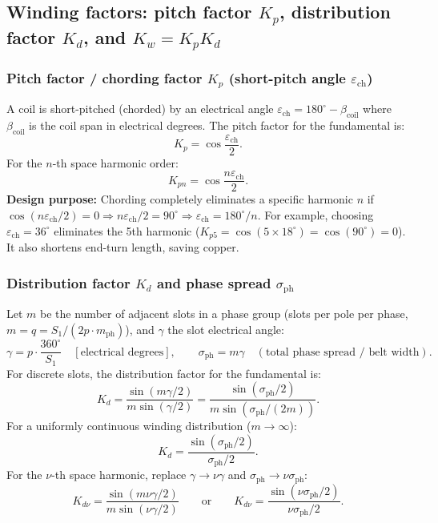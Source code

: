 \subsection{Winding factors: pitch factor $K_p$, distribution factor $K_d$, and $K_w = K_p K_d$}

\subsubsection{Pitch factor / chording factor $K_p$ (short-pitch angle $\varepsilon_{\mathrm{ch}}$)}
A coil is short-pitched (chorded) by an electrical angle \(\varepsilon_{\mathrm{ch}} = 180^\circ - \beta_{\mathrm{coil}}\) where \(\beta_{\mathrm{coil}}\) is the coil span in electrical degrees.
The pitch factor for the fundamental is:
\[
K_p = \cos\frac{\varepsilon_{\mathrm{ch}}}{2}.
\]
For the \(n\)-th space harmonic order:
\[
K_{pn} = \cos\frac{n\varepsilon_{\mathrm{ch}}}{2}.
\]
\textbf{Design purpose:} Chording completely eliminates a specific harmonic \(n\) if \(\cos(n\varepsilon_{\mathrm{ch}}/2) = 0 \Rightarrow n\varepsilon_{\mathrm{ch}}/2 = 90^\circ \Rightarrow \varepsilon_{\mathrm{ch}} = 180^\circ/n\). For example, choosing \(\varepsilon_{\mathrm{ch}} = 36^\circ\) eliminates the 5th harmonic (\(K_{p5} = \cos(5\times 18^\circ) = \cos(90^\circ) = 0\)). It also shortens end-turn length, saving copper.

\subsubsection{Distribution factor $K_d$ and phase spread $\sigma_{\mathrm{ph}}$}
Let \(m\) be the number of adjacent slots in a phase group (slots per pole per phase, \(m = q = S_1/(2p \cdot m_{\mathrm{ph}})\)), and \(\gamma\) the slot electrical angle:
\[
\gamma = p \cdot \frac{360^\circ}{S_1}\quad[\text{electrical degrees}],
\qquad
\sigma_{\mathrm{ph}} = m\gamma\quad(\text{total phase spread / belt width}).
\]
For discrete slots, the distribution factor for the fundamental is:
\[
K_d = \frac{\sin(m\gamma/2)}{m\sin(\gamma/2)} = \frac{\sin(\sigma_{\mathrm{ph}}/2)}{m\sin(\sigma_{\mathrm{ph}}/(2m))}.
\]
For a uniformly continuous winding distribution (\(m\to\infty\)):
\[
K_d = \frac{\sin(\sigma_{\mathrm{ph}}/2)}{\sigma_{\mathrm{ph}}/2}.
\]
For the \(\nu\)-th space harmonic, replace \(\gamma\to \nu\gamma\) and \(\sigma_{\mathrm{ph}}\to \nu\sigma_{\mathrm{ph}}\):
\[
K_{d\nu} = \frac{\sin(m\nu\gamma/2)}{m\sin(\nu\gamma/2)}
\qquad\text{or}\qquad
K_{d\nu} = \frac{\sin(\nu\sigma_{\mathrm{ph}}/2)}{\nu\sigma_{\mathrm{ph}}/2}.
\]


